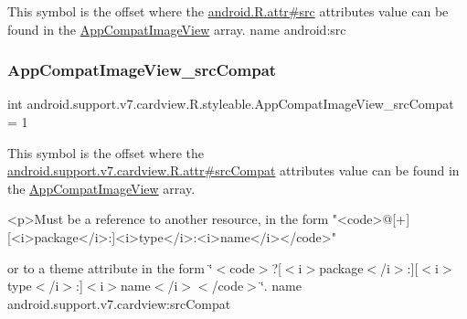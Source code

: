 This symbol is the offset where the \hyperlink{}{android.\+R.\+attr\#src} attribute\textquotesingle{}s value can be found in the \hyperlink{classandroid_1_1support_1_1v7_1_1cardview_1_1R_1_1styleable_ae53f264fbfeb101a6955fa11b459709d}{App\+Compat\+Image\+View} array.  name android\+:src \mbox{\label{classandroid_1_1support_1_1v7_1_1cardview_1_1R_1_1styleable_a846bf5775d1a9c0dd8b2d322212fda3a}} 
\subsubsection{\texorpdfstring{App\+Compat\+Image\+View\+\_\+src\+Compat}{AppCompatImageView\_srcCompat}}
{\footnotesize\ttfamily int android.\+support.\+v7.\+cardview.\+R.\+styleable.\+App\+Compat\+Image\+View\+\_\+src\+Compat = 1\hspace{0.3cm}{\ttfamily [static]}}

This symbol is the offset where the \hyperlink{classandroid_1_1support_1_1v7_1_1cardview_1_1R_1_1attr_ad0878331bfa33ef9e4e6672067245514}{android.\+support.\+v7.\+cardview.\+R.\+attr\#src\+Compat} attribute\textquotesingle{}s value can be found in the \hyperlink{classandroid_1_1support_1_1v7_1_1cardview_1_1R_1_1styleable_ae53f264fbfeb101a6955fa11b459709d}{App\+Compat\+Image\+View} array.

\begin{DoxyVerb}      <p>Must be a reference to another resource, in the form "<code>@[+][<i>package</i>:]<i>type</i>:<i>name</i></code>"
\end{DoxyVerb}
 or to a theme attribute in the form \char`\"{}$<$code$>$?\mbox{[}$<$i$>$package$<$/i$>$\+:\mbox{]}\mbox{[}$<$i$>$type$<$/i$>$\+:\mbox{]}$<$i$>$name$<$/i$>$$<$/code$>$\char`\"{}.  name android.\+support.\+v7.\+cardview\+:src\+Compat \mbox{\label{classandroid_1_1support_1_1v7_1_1cardview_1_1R_1_1styleable_af61bc97363f0e3c84c9e3784694f0888}} 
